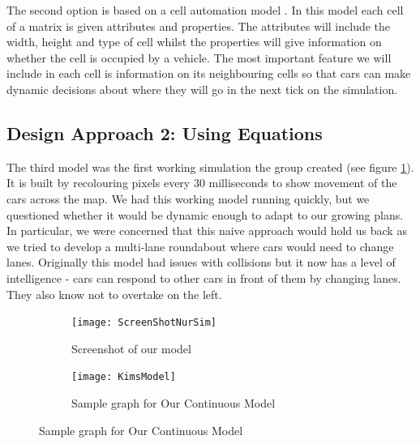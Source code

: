 \documentclass[11pt]{article}
\begin{document}
	
	The second option is based on a cell automation model \cite{namekawa2005general}. 
	In this model each cell of a matrix is given attributes and properties. 
	The attributes will include the width, height and type of cell whilst the properties will give information on whether the cell is occupied by a vehicle. 
	The most important feature we will include in each cell is information on its neighbouring cells so that cars can make dynamic decisions about where they will go in the next tick on the simulation.
	
	
	\subsection{Design Approach 2: Using Equations}
	\FloatBarrier
	
	
    The third model was the first working simulation the group created (see figure \ref{NurScreenshot}). 
    It is built by recolouring pixels every 30 milliseconds to show movement of the cars across the map. 
    We had this working model running quickly, but we questioned whether it would be dynamic enough to adapt to our growing plans. 
    In particular, we were concerned that this naive approach would hold us back as we tried to develop a multi-lane roundabout where cars would need to change lanes. 
    Originally this model had issues with collisions but it now has a level of intelligence - cars can respond to other cars in front of them by changing lanes. 
    They also know not to overtake on the left. 	
    
\begin{figure}
	
	\centering
	\begin{subfigure}{.35\textwidth}
		\centering
		\texttt{[image: ScreenShotNurSim]}
		\caption{Screenshot of  our model }
		\label{NurScreenshot}
	\end{subfigure}
	\begin{subfigure}{.35\textwidth}
		\centering
		\texttt{[image: KimsModel]}
		\caption{Sample graph for Our Continuous Model}
		\label{KimModel}
	\end{subfigure}
\end{figure}	
%		
\end{document}
